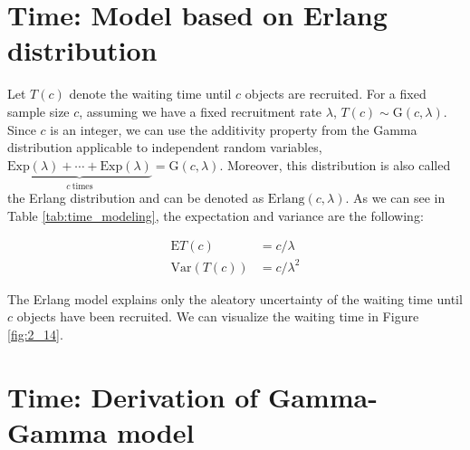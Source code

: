 \begin{table}[h!]
\centering
{}
\caption{Moments and aleatory and epistemic uncertainty of recruitment covered by different models for time having a fixed sample size $c$.}
\label{tab:time_modeling}
\end{table}

\section{Time: Model based on Erlang distribution}
Let $T(c)$ denote the waiting time until $c$ objects are recruited. For a fixed sample size $c$, assuming we have a fixed recruitment rate $\lambda$, $T(c)\sim\textrm{G}(c, \lambda)$. Since $c$ is an integer, we can use the additivity property from the Gamma distribution applicable to independent random variables, $\underbrace{\textrm{Exp} (\lambda) +\cdots +\textrm{Exp} (\lambda)}_{c \ \text{times}} = \textrm{G} (c, \lambda)$. Moreover, this distribution is also called the Erlang distribution and can be denoted as $\textrm{Erlang} (c, \lambda)$. As we can see in Table \ref{tab:time_modeling}, the expectation and variance are the following:

\begin{align*}
\textrm{E}T(c) & = c/\lambda\\
\textrm{Var}(T(c)) & = c/\lambda^2
\end{align*}

The Erlang model explains only the aleatory uncertainty of the waiting time until $c$ objects have been recruited. We can visualize the waiting time in Figure \ref{fig:2_14}.

\section{Time: Derivation of Gamma-Gamma model}

